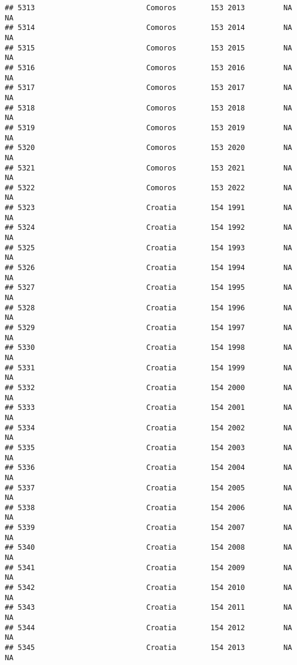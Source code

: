 \documentclass[
]{article}
\begin{document}
\begin{verbatim}
## 5313                          Comoros        153 2013         NA         NA
## 5314                          Comoros        153 2014         NA         NA
## 5315                          Comoros        153 2015         NA         NA
## 5316                          Comoros        153 2016         NA         NA
## 5317                          Comoros        153 2017         NA         NA
## 5318                          Comoros        153 2018         NA         NA
## 5319                          Comoros        153 2019         NA         NA
## 5320                          Comoros        153 2020         NA         NA
## 5321                          Comoros        153 2021         NA         NA
## 5322                          Comoros        153 2022         NA         NA
## 5323                          Croatia        154 1991         NA         NA
## 5324                          Croatia        154 1992         NA         NA
## 5325                          Croatia        154 1993         NA         NA
## 5326                          Croatia        154 1994         NA         NA
## 5327                          Croatia        154 1995         NA         NA
## 5328                          Croatia        154 1996         NA         NA
## 5329                          Croatia        154 1997         NA         NA
## 5330                          Croatia        154 1998         NA         NA
## 5331                          Croatia        154 1999         NA         NA
## 5332                          Croatia        154 2000         NA         NA
## 5333                          Croatia        154 2001         NA         NA
## 5334                          Croatia        154 2002         NA         NA
## 5335                          Croatia        154 2003         NA         NA
## 5336                          Croatia        154 2004         NA         NA
## 5337                          Croatia        154 2005         NA         NA
## 5338                          Croatia        154 2006         NA         NA
## 5339                          Croatia        154 2007         NA         NA
## 5340                          Croatia        154 2008         NA         NA
## 5341                          Croatia        154 2009         NA         NA
## 5342                          Croatia        154 2010         NA         NA
## 5343                          Croatia        154 2011         NA         NA
## 5344                          Croatia        154 2012         NA         NA
## 5345                          Croatia        154 2013         NA         NA

\end{verbatim}
\end{document}
